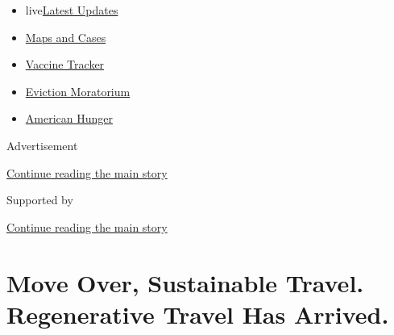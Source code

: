 \begin{itemize}
\tightlist
\item
  live\href{https://www.nytimes3xbfgragh.onion/2020/09/08/world/covid-19-coronavirus.html?name=styln-coronavirus-national\&region=TOP_BANNER\&block=storyline_menu_recirc\&action=click\&pgtype=Article\&impression_id=4ffd9731-f1b7-11ea-920e-9d20be26e6a7\&variant=undefined}{Latest
  Updates}
\item
  \href{https://www.nytimes3xbfgragh.onion/interactive/2020/us/coronavirus-us-cases.html?name=styln-coronavirus-national\&region=TOP_BANNER\&block=storyline_menu_recirc\&action=click\&pgtype=Article\&impression_id=4ffd9732-f1b7-11ea-920e-9d20be26e6a7\&variant=undefined}{Maps
  and Cases}
\item
  \href{https://www.nytimes3xbfgragh.onion/interactive/2020/science/coronavirus-vaccine-tracker.html?name=styln-coronavirus-national\&region=TOP_BANNER\&block=storyline_menu_recirc\&action=click\&pgtype=Article\&impression_id=4ffd9733-f1b7-11ea-920e-9d20be26e6a7\&variant=undefined}{Vaccine
  Tracker}
\item
  \href{https://www.nytimes3xbfgragh.onion/2020/09/02/your-money/eviction-moratorium-covid.html?name=styln-coronavirus-national\&region=TOP_BANNER\&block=storyline_menu_recirc\&action=click\&pgtype=Article\&impression_id=4ffd9734-f1b7-11ea-920e-9d20be26e6a7\&variant=undefined}{Eviction
  Moratorium}
\item
  \href{https://www.nytimes3xbfgragh.onion/interactive/2020/09/02/magazine/food-insecurity-hunger-us.html?name=styln-coronavirus-national\&region=TOP_BANNER\&block=storyline_menu_recirc\&action=click\&pgtype=Article\&impression_id=4ffdbe40-f1b7-11ea-920e-9d20be26e6a7\&variant=undefined}{American
  Hunger}
\end{itemize}

Advertisement

\protect\hyperlink{after-top}{Continue reading the main story}

Supported by

\protect\hyperlink{after-sponsor}{Continue reading the main story}

\hypertarget{move-over-sustainable-travel-regenerative-travel-has-arrived}{%
\section{Move Over, Sustainable Travel. Regenerative Travel Has
Arrived.}\label{move-over-sustainable-travel-regenerative-travel-has-arrived}}

